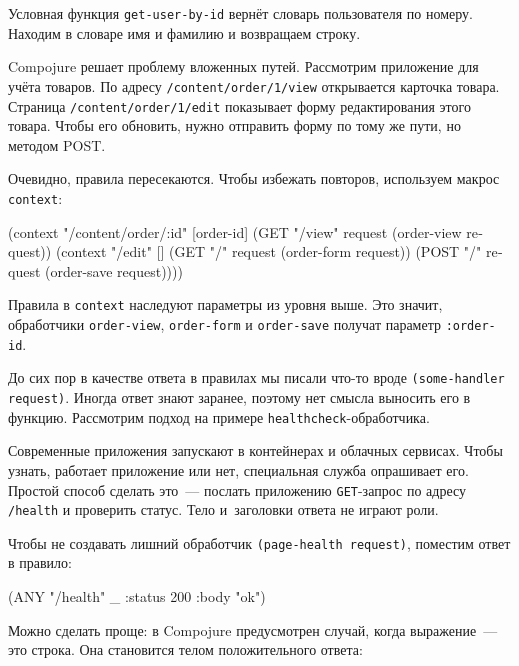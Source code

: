 Условная функция \verb|get-user-by-id| вернёт словарь пользователя по
номеру. Находим в словаре имя и фамилию и возвращаем строку.

Compojure решает проблему вложенных путей. Рассмотрим приложение для учёта
товаров. По адресу \verb|/content/order/1/view| открывается карточка
товара. Страница \verb|/content/order/1/edit| показывает форму редактирования
этого товара. Чтобы его обновить, нужно отправить форму по тому же пути, но
методом POST.

Очевидно, правила пересекаются. Чтобы избежать повторов, используем макрос
\verb|context|:


\begin{english}
  \begin{clojure}
(context "/content/order/:id" [order-id]
  (GET  "/view" request (order-view request))
  (context "/edit" []
    (GET  "/" request (order-form request))
    (POST "/" request (order-save request))))
  \end{clojure}
\end{english}

Правила в \verb|context| наследуют параметры из уровня выше. Это значит,
обработчики \verb|order-view|, \verb|order-form| и \verb|order-save|
получат параметр \verb|:order-id|.

До сих пор в качестве ответа в правилах мы писали что-то вроде
\verb|(some-handler request)|. Иногда ответ знают заранее, поэтому нет смысла
выносить его в функцию. Рассмотрим подход на примере
\verb|healthcheck|-обработчика.

Современные приложения запускают в контейнерах и облачных сервисах. Чтобы
узнать, работает приложение или нет, специальная служба опрашивает его. Простой
способ сделать это~--- послать приложению \verb|GET|-запрос по адресу
\verb|/health| и проверить статус. Тело и~заголовки ответа не играют роли.

Чтобы не создавать лишний обработчик \verb|(page-health request)|, поместим
ответ в правило:


\begin{english}
  \begin{clojure}
(ANY "/health" _ {:status 200 :body "ok"})
  \end{clojure}
\end{english}

Можно сделать проще: в Compojure предусмотрен случай, когда выражение~--- это
строка. Она становится телом положительного ответа:

